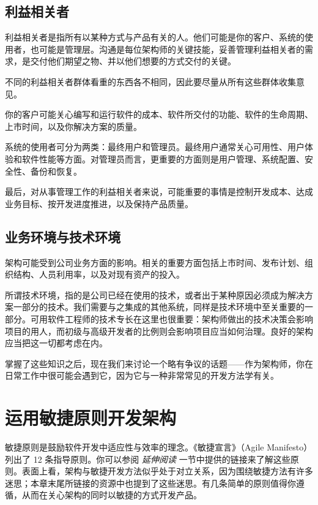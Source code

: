\subsection{利益相关者}

\label{idx:015}
利益相关者是指所有以某种方式与产品有关的人。他们可能是你的客户、系统的使用者，也可能是管理层。沟通是每位架构师的关键技能，妥善管理利益相关者的需求，是交付他们期望之物、并以他们想要的方式交付的关键。

不同的利益相关者群体看重的东西各不相同，因此要尽量从所有这些群体收集意见。

你的客户可能关心编写和运行软件的成本、软件所交付的功能、软件的生命周期、上市时间，以及你解决方案的质量。

系统的使用者可分为两类：最终用户和管理员。最终用户通常关心可用性、用户体验和软件性能等方面。对管理员而言，更重要的方面则是用户管理、系统配置、安全性、备份和恢复。

最后，对从事管理工作的利益相关者来说，可能重要的事情是控制开发成本、达成业务目标、按开发进度推进，以及保持产品质量。

\subsection{业务环境与技术环境}

\label{idx:016}
架构可能受到公司业务方面的影响。相关的重要方面包括上市时间、发布计划、组织结构、人员利用率，以及对现有资产的投入。

所谓技术环境，指的是公司已经在使用的技术，或者出于某种原因必须成为解决方案一部分的技术。我们需要与之集成的其他系统，同样是技术环境中至关重要的一部分。可用软件工程师的技术专长在这里也很重要：架构师做出的技术决策会影响项目的用人，而初级与高级开发者的比例则会影响项目应当如何治理。良好的架构应当把这一切都考虑在内。

掌握了这些知识之后，现在我们来讨论一个略有争议的话题——作为架构师，你在日常工作中很可能会遇到它，因为它与一种非常常见的开发方法学有关。

\section{运用敏捷原则开发架构}

\label{idx:017}
\label{idx:018}
敏捷原则是鼓励软件开发中适应性与效率的理念。《敏捷宣言》（Agile Manifesto）列出了 12 条指导原则。你可以参阅 \emph{延伸阅读} 一节中提供的链接来了解这些原则。表面上看，架构与敏捷开发方法似乎处于对立关系，因为围绕敏捷方法有许多迷思；本章末尾所链接的资源中也提到了这些迷思。有几条简单的原则值得你遵循，从而在关心架构的同时以敏捷的方式开发产品。

